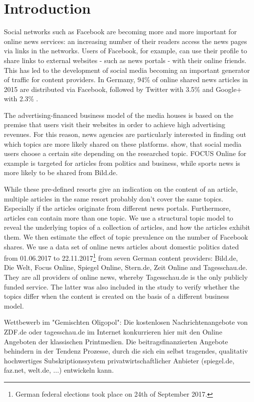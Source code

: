 \documentclass[12pt,a4paper,notitlepage]{article}
\begin{document}
\section{Introduction}

Social networks such as Facebook are becoming more and more important for online news services: an increasing number of their readers access the news pages via links in the networks. Users of Facebook, for example, can use their profile to share links to external websites - such as news portals - with their online friends. This has led to the development of social media becoming an important generator of traffic for content providers. In Germany, 94\% of online shared news articles in 2015 are distributed via Facebook, followed by Twitter with 3.5\% and Google+ with 2.3\% \citep{schiller_development_2016}. 


The advertising-financed business model of the media houses is based on the premise that users visit their websites in order to achieve high advertising revenues. For this reason, news agencies are particularly interested in finding out which topics are more likely shared on these platforms. \citet{schiller_development_2016} show, that social media users choose a certain site depending on the researched topic. FOCUS Online for example is targeted for articles from politics and business, while sports news is more likely to be shared from Bild.de. 

While these pre-defined resorts give an indication on the content of an article, multiple articles in the same resort probably don't cover the same topics. Especially if the articles originate from different news portals. Furthermore, articles can contain more than one topic. We use a structural topic model to reveal the underlying topics of a collection of articles, and how the articles exhibit them. We then estimate the effect of topic prevalence on the number of Facebook shares. We use a data set of online news articles about domestic politics dated from 01.06.2017 to 22.11.2017\footnote{German federal elections took place on 24th of September 2017.} from seven German content providers: Bild.de, Die Welt, Focus Online, Spiegel Online, Stern.de, Zeit Online and Tagesschau.de. They are all providers of online news, whereby Tagesschau.de is the only publicly funded service. The latter was also included in the study to verify whether the topics differ when the content is created on the basis of a different business model. 


Wettbewerb im "Gemischten Oligopol": Die kostenlosen Nachrichtenangebote von ZDF.de oder tagesschau.de im Internet konkurrieren hier mit den Online Angeboten der klassischen Printmedien. Die beitragsfinanzierten Angebote behindern in der Tendenz Prozesse, durch die sich ein selbst tragendes, qualitativ hochwertiges Subskriptionssystem privatwirtschaftlicher Anbieter (spiegel.de, faz.net, welt.de, ...) entwickeln kann. 
 
\end{document}
